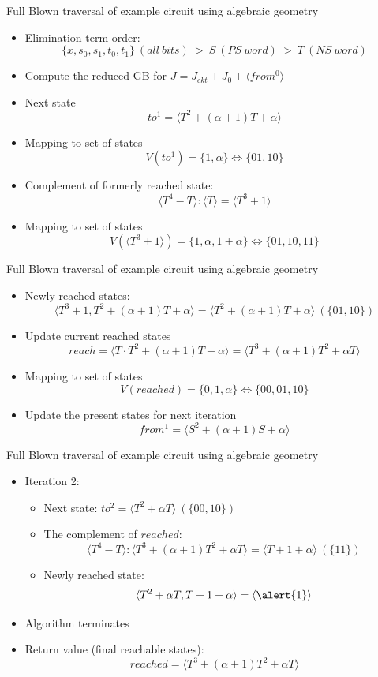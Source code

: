 \documentclass[xcolor=dvipsnames]{beamer}
\newcommand{\bi}{\begin{itemize}}
\newcommand{\ei}{\end{itemize}}
\begin{document}
\begin{frame}[label = pptpage2]{\large{Full Blown traversal of example circuit using algebraic geometry}}
\bi
\item Elimination term order: 
$$\{x,s_0,s_1,t_0,t_1\}~(all~bits)~>~S~(PS~word)~ >~ T~(NS~word)$$
\item Compute the reduced GB for $J = J_{ckt}+J_0+\langle from^0\rangle$
\item Next state 
$$to^1 = \langle T^2+(\alpha+1)T+\alpha\rangle$$ 
\item Mapping to set of states
$$V(to^1) = \{1,\alpha\} \Leftrightarrow \{01,10\}$$
\item Complement of formerly reached state:
$$\langle T^4-T\rangle:\langle T\rangle = \langle T^3+1\rangle$$ 
\item Mapping to set of states
$$V(\langle T^3+1\rangle) = \{1,\alpha,1+\alpha\} \Leftrightarrow \{01,10,11\}$$
\ei
\hyperlink{linkSTG}{}
\end{frame}
\begin{frame}[label = pptpage3]{\large{Full Blown traversal of example circuit using algebraic geometry}}
\bi
\item Newly reached states:
$$\langle T^3+1, T^2+(\alpha+1)T+\alpha \rangle = \langle T^2+(\alpha+1)T+\alpha \rangle~(\{01,10\})$$ 
\item Update current reached states 
$$reach = \langle T\cdot T^2+(\alpha+1)T+\alpha \rangle = \langle T^3+(\alpha+1)T^2+\alpha T\rangle$$ 
\item Mapping to set of states
$$V(reached) = \{0,1,\alpha\} \Leftrightarrow \{00,01,10\}$$
\item Update the present states for next iteration
$$from^1 = \langle S^2+(\alpha+1)S+\alpha\rangle$$
\ei
\hyperlink{linkSTG}{}
\end{frame}


\begin{frame}{\large{Full Blown traversal of example circuit using algebraic geometry}}
\bi
\item Iteration 2:
	\bi
	\item Next state: $to^2 = \langle T^2+\alpha T\rangle~(\{00,10\})$
	\item The complement of $reached$:
	$$\langle T^4-T\rangle:\langle T^3+(\alpha+1)T^2+\alpha T\rangle
= \langle T + 1+\alpha\rangle ~(\{11\})$$ 
	\item Newly reached state: 
$$\langle T^2+\alpha T, T+1+\alpha \rangle = \langle \alert{1}\rangle$$ 
	\ei
\item Algorithm terminates
\item Return value (final reachable states):
$$reached = \langle T^3+(\alpha+1)T^2+\alpha T\rangle$$
\ei
\end{frame}
\end{document}
